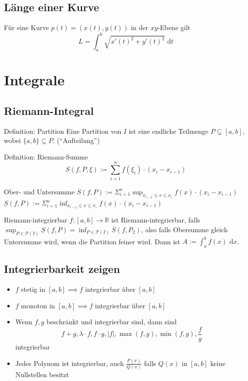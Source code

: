 \documentclass[a4paper,10pt]{article}
\def\R{\mathbb{R}}
\def\dx{\text{ d}x}
\begin{document}
\subsection{Länge einer Kurve}
Für eine Kurve $p(t) = (x(t), y(t))$ in der $xy$-Ebene gilt 
$$L = \int_a^b \sqrt{x'(t)^2+ y'(t)^2} \text{ d}t$$

\section{Integrale}
\subsection{Riemann-Integral}
\begin{subbox}{Definition: Partition}
 Eine Partition von $I$ ist eine endliche Teilmenge $P \subsetneq [a,b]$, wobei $\{a,b\} \subseteq P$. (``Aufteilung'')
\end{subbox}
\begin{mainbox}{Definition: Riemann-Summe}
 $$S(f, P, \xi) := \sum_{i=1}^n f(\xi_i) \cdot (x_i - x_{i-1})$$
\end{mainbox}
\begin{subbox}{Ober- und Untersumme}
 $\overline{S}(f,P) := \Sigma_{i=1}^{n} \sup_{x_{i-1} \leq x \leq x_i} f(x) \cdot (x_i - x_{i-1})$ \\
 $\underline{S}(f,P) := \Sigma_{i=1}^{n} \inf_{x_{i-1} \leq x \leq x_i} f(x) \cdot (x_i - x_{i-1})$
\end{subbox}
\begin{mainbox}{Riemann-integrierbar}
 $f:[a,b] \to \R$ ist Riemann-integrierbar, falls $\sup_{P \in \mathcal{P}(I)} \underline{S}(f,P) = \inf_{P \in \mathcal{P}(I)}\overline{S}(f, P_2)$, also falls Obersumme gleich Untersumme wird, wenn die Partition feiner wird. Dann ist $A := \int_a^b f(x)\dx$.
\end{mainbox}

\subsection{Integrierbarkeit zeigen}
\begin{itemize}
 \item $f$ stetig in $[a,b] \implies f$ integrierbar über $[a,b]$
 \item $f$ monoton in $[a,b] \implies f$ integrierbar über $[a,b]$
 \item Wenn $f,g$ beschränkt und integrierbar sind, dann sind
 $$f+g, \lambda \cdot f, f \cdot g, |f|, \max(f,g), \min(f,g), \frac{f}{g}$$ integrierbar
 \item Jedes Polynom ist integrierbar, auch $\frac{P(x)}{Q(x)}$ falls $Q(x)$ in $[a,b]$ keine Nullstellen besitzt
\end{itemize}
\end{document}

